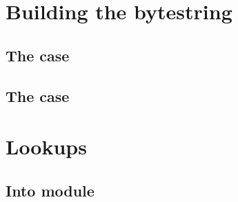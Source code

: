 \section{Building the bytestring}
\subsection{The  case}                             			  \label{rlp_addr: recipe_1}
\subsection{The  case}                             			  \label{rlp_addr: recipe_2}

\section{Lookups}
\subsection{Into \trmMod{} module} 						 \label{rlp_addr: lookups: into_trm}